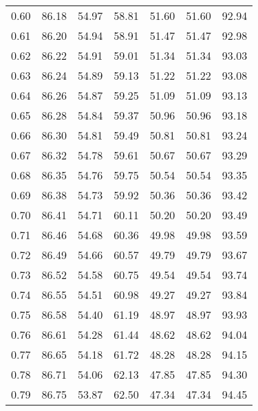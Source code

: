 \begin{tabular}{|c|c|c|c|c|c|c|}
      0.60 &     86.18 &     54.97 &      58.81 &   51.60 &      51.60 &         92.94 \\
      0.61 &     86.20 &     54.94 &      58.91 &   51.47 &      51.47 &         92.98 \\
      0.62 &     86.22 &     54.91 &      59.01 &   51.34 &      51.34 &         93.03 \\
      0.63 &     86.24 &     54.89 &      59.13 &   51.22 &      51.22 &         93.08 \\
      0.64 &     86.26 &     54.87 &      59.25 &   51.09 &      51.09 &         93.13 \\
      0.65 &     86.28 &     54.84 &      59.37 &   50.96 &      50.96 &         93.18 \\
      0.66 &     86.30 &     54.81 &      59.49 &   50.81 &      50.81 &         93.24 \\
      0.67 &     86.32 &     54.78 &      59.61 &   50.67 &      50.67 &         93.29 \\
      0.68 &     86.35 &     54.76 &      59.75 &   50.54 &      50.54 &         93.35 \\
      0.69 &     86.38 &     54.73 &      59.92 &   50.36 &      50.36 &         93.42 \\
      0.70 &     86.41 &     54.71 &      60.11 &   50.20 &      50.20 &         93.49 \\
      0.71 &     86.46 &     54.68 &      60.36 &   49.98 &      49.98 &         93.59 \\
      0.72 &     86.49 &     54.66 &      60.57 &   49.79 &      49.79 &         93.67 \\
      0.73 &     86.52 &     54.58 &      60.75 &   49.54 &      49.54 &         93.74 \\
      0.74 &     86.55 &     54.51 &      60.98 &   49.27 &      49.27 &         93.84 \\
      0.75 &     86.58 &     54.40 &      61.19 &   48.97 &      48.97 &         93.93 \\
      0.76 &     86.61 &     54.28 &      61.44 &   48.62 &      48.62 &         94.04 \\
      0.77 &     86.65 &     54.18 &      61.72 &   48.28 &      48.28 &         94.15 \\
      0.78 &     86.71 &     54.06 &      62.13 &   47.85 &      47.85 &         94.30 \\
      0.79 &     86.75 &     53.87 &      62.50 &   47.34 &      47.34 &         94.45 \\

\end{tabular}
